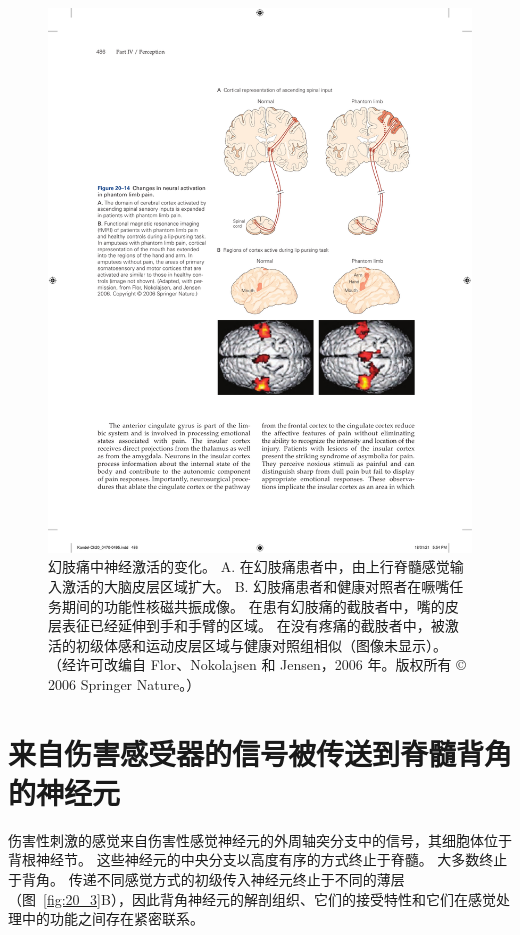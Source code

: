 \begin{figure}[htbp]
	\centering
	\includegraphics[width=0.7\linewidth]{chap20/fig_20_14}
	\caption{幻肢痛中神经激活的变化。
		A. 在幻肢痛患者中，由上行脊髓感觉输入激活的大脑皮层区域扩大。
		B. 幻肢痛患者和健康对照者在噘嘴任务期间的功能性核磁共振成像。
		在患有幻肢痛的截肢者中，嘴的皮层表征已经延伸到手和手臂的区域。
		在没有疼痛的截肢者中，被激活的初级体感和运动皮层区域与健康对照组相似（图像未显示）。 （经许可改编自 Flor、Nokolajsen 和 Jensen，2006 年。版权所有 © 2006 Springer Nature。）}
	\label{fig:20_14}
\end{figure}



\section{来自伤害感受器的信号被传送到脊髓背角的神经元}

伤害性刺激的感觉来自伤害性感觉神经元的外周轴突分支中的信号，其细胞体位于背根神经节。
这些神经元的中央分支以高度有序的方式终止于脊髓。
大多数终止于背角。
传递不同感觉方式的初级传入神经元终止于不同的薄层（图~\ref{fig:20_3}B），因此背角神经元的解剖组织、它们的接受特性和它们在感觉处理中的功能之间存在紧密联系。


